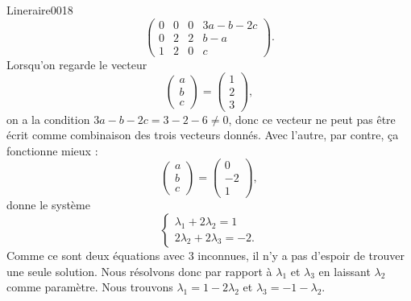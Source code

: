 \begin{corrige}{Lineraire0018}
	\begin{equation}
		\left(\begin{array}{ccc|c}
			 0	&	0	&	0	&	3a-b-2c	\\
			  0	&	2	&	2	&	b-a\\
			   1	&	2	&	0	&	c	 
		   \end{array}\right).
	\end{equation}
	Lorsqu'on regarde le vecteur
	\begin{equation}
		\begin{pmatrix}
			a	\\ 
			b	\\ 
			c	
		\end{pmatrix}
		=
		\begin{pmatrix}
			1	\\ 
			2	\\ 
			3	
		\end{pmatrix},
	\end{equation}
	on a la condition $3a-b-2c=3-2-6\neq 0$, donc ce vecteur ne peut pas être écrit comme combinaison des trois vecteurs donnés. Avec l'autre, par contre, ça fonctionne mieux :
	\begin{equation}
		\begin{pmatrix}
			a	\\ 
			b	\\ 
			c	
		\end{pmatrix}=
		\begin{pmatrix}
			0	\\ 
			-2	\\ 
			1	
		\end{pmatrix},
	\end{equation}
	donne le système
	\begin{equation}
		\left\{
		\begin{array}{ll}
			\lambda_1+2\lambda_2=1\\
			2 \lambda_2+2\lambda_3=-2.
		\end{array}
		\right.
	\end{equation}
	Comme ce sont deux équations avec 3 inconnues, il n'y a pas d'espoir de trouver une seule solution. Nous résolvons donc par rapport à $\lambda_1$ et $\lambda_3$ en laissant $\lambda_2$ comme paramètre. Nous trouvons $\lambda_1=1-2\lambda_2$ et $\lambda_3=-1-\lambda_2$.


\end{corrige}
